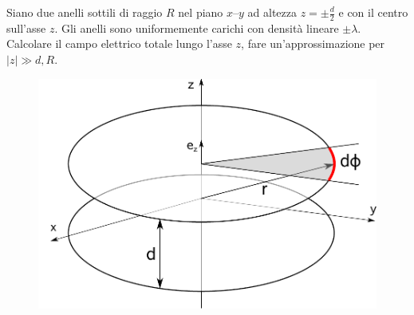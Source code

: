 \begin{Es}
  Siano due anelli sottili di raggio $R$ nel piano $x$--$y$ ad altezza $z=\pm\frac{d}{2}$ e con il centro sull'asse $z$. Gli anelli sono uniformemente carichi con densità lineare $\pm\lambda$. Calcolare il campo elettrico totale lungo l'asse $z$, fare un'approssimazione per $|z|\gg d,R$.
  \begin{figure}[htbp]
    \centering
    \includegraphics[scale=0.5]{immagini/fisica2/due_anelli_schema}
  \end{figure}


\end{Es}
